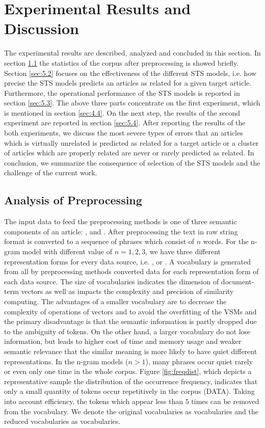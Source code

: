
\section{Experimental Results and Discussion}
\label{sec:5}

The experimental results are described, analyzed and concluded in this section. In section \ref{sec:5.1} the statistics of the corpus after preprocessing is showed briefly. Section \ref{sec:5.2} focuses on the effectiveness of the different STS models, i.e. how precise the STS models predicts an articles as related for a given target article. Furthermore, the operational performance of the STS models is reported in section \ref{sec:5.3}. The above three parts concentrate on the first experiment, which is mentioned in section \ref{sec:4.4}. On the next step, the results of the second experiment are reported in section \ref{sec:5.4}. After reporting the results of the both experiments, we discuss the most severe types of errors that an articles which is virtually unrelated is predicted as related for a target article or a cluster of articles which are properly related are never or rarely predicted as related. In conclusion, we summarize the consequence of selection of the STS models and the challenge of the current work. 

\subsection{Analysis of Preprocessing}
\label{sec:5.1}

The input data to feed the preprocessing methods is one of three semantic components of an article: \ititle, \isummary and \icontent. After preprocessing the text in raw string format is converted to a sequence of phrases which consist of $n$ words. For the n-gram model with different value of $n = 1, 2, 3$, we have three different representation forms for every data source, i.e. \ititle, \isummary or \icontent. A vocabulary is generated from all by preprocessing methods converted data for each representation form of each data source. The size of vocabularies indicates the dimension of document-term vectors as well as impacts the complexity and precision of similarity computing. The advantages of a smaller vocabulary are to decrease the complexity of operations of vectors and to avoid the overfitting of the VSMs and the primary disadvantage is that the semantic information is partly dropped due to the ambiguity of tokens. On the other hand, a larger vocabulary do not lose information, but leads to higher cost of time and memory usage and weaker semantic relevance that the similar meaning is more likely to have quiet different representations. In the n-gram models ($n > 1$), many phrases occur quiet rarely or even only one time in the whole corpus. Figure \ref{fig:freqdist}, which depicts a representative sample the distribution of the occurrence frequency, indicates that only a small quantity of tokens occur repetitively in the corpus (DATA). Taking into account efficiency, the tokens which appear less than $5$ times can be removed from the vocabulary. We denote the original vocabularies as \ifull vocabularies and the reduced vocabularies as \icommon vocabularies. 

